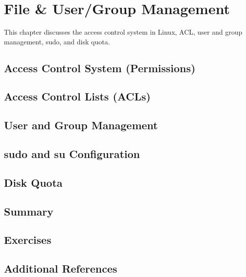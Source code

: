 
\chapter{File \& User/Group Management}
\label{ch:file-and-user-management}

This chapter discusses the access control system in Linux, ACL, user and group management,
sudo, and disk quota.

\section{Access Control System (Permissions)}
\section{Access Control Lists (ACLs)}
\section{User and Group Management}
\section{sudo and su Configuration}
\section{Disk Quota}
\section{Summary}
\section{Exercises}
\section{Additional References}
